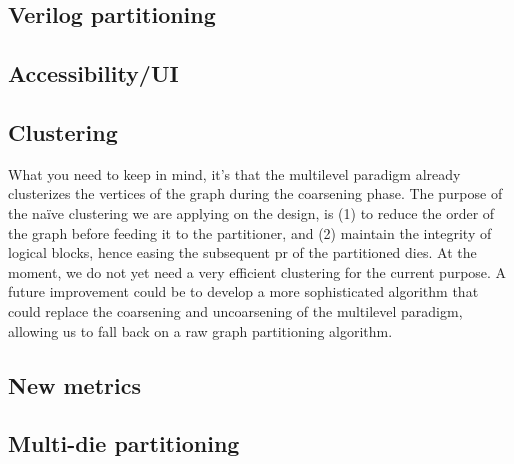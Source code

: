 \documentclass[11pt,a4paper]{article}
\theoremstyle{customdef}
\begin{document}
\subsection{Verilog partitioning}
\subsection{Accessibility/UI}
\subsection{Clustering}
What you need to keep in mind, it's that the multilevel paradigm already clusterizes the vertices of the graph during the coarsening phase.
The purpose of the naïve clustering we are applying on the design, is (1) to reduce the order of the graph before feeding it to the partitioner, and (2) maintain the integrity of logical blocks, hence easing the subsequent \gls{pr} of the partitioned dies.
At the moment, we do not yet need a very efficient clustering for the current purpose.
A future improvement could be to develop a more sophisticated algorithm that could replace the coarsening and uncoarsening of the multilevel paradigm, allowing us to fall back on a raw graph partitioning algorithm.
\subsection{New metrics}
\subsection{Multi-die partitioning}

\clearpage

\newpage

% 

\end{document}
